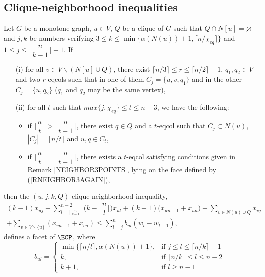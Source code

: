 \subsection{Clique-neighborhood inequalities}

\begin{tthm} \label{TNEIGHBOR3}
Let $G$ be a monotone graph, $u \in V$, $Q$ be a clique of $G$ such that $Q \cap N[u]=\varnothing$ and $j,k$
be numbers verifying $3 \leq k \leq \min \{\alpha(N(u)) + 1, \lceil n/\chi_{eq} \rceil\}$ and
$1 \leq j \leq \biggl\lceil \dfrac{n}{k-1} \biggr\rceil - 1$. If
\begin{enumerate}
\item[(i)] for all $v \in V \backslash (N[u] \cup Q)$, there exist
$\lceil n/3 \rceil \leq r \leq \lceil n/2 \rceil - 1$, $q_1, q_2 \in V$ and two $r$-eqcols such that in one of them
$C_j = \{u, v, q_1\}$ and in the other $C_j = \{u , q_2\}$ ($q_1$ and $q_2$ may be the same vertex),
\item[(ii)] for all $t$ such that $max \{ j, \chi_{eq} \} \leq t \leq n - 3$, we have the following:
\begin{itemize}
\item if $\biggl\lceil \dfrac{n}{t} \biggr\rceil > \biggl\lceil \dfrac{n}{t+1} \biggr\rceil$, there exist $q \in Q$ and
a $t$-eqcol such that $C_j \subset N(u)$, $|C_j| = \lceil n/t \rceil$ and $u, q \in C_t$,
\item if $\biggl\lceil \dfrac{n}{t} \biggr\rceil = \biggl\lceil \dfrac{n}{t+1} \biggr\rceil$, there exists a $t$-eqcol
satisfying conditions given in Remark \ref{NEIGHBOR3POINTS}, \ie lying on the face defined by (\ref{RNEIGHBOR3AGAIN}),
\end{itemize} \end{enumerate}
then the $(u,j,k,Q)$-clique-neighborhood inequality, \ie
\begin{multline} \label{RNEIGHBOR3AGAIN}
(k - 1) x_{uj} +
\sum_{l = \lceil \frac{n}{k-1} \rceil}^{n-2} \biggl(k - \biggl\lceil \dfrac{n}{l} \biggr\rceil \biggr) x_{ul} +
(k - 1) \bigl(x_{u n-1} + x_{un} \bigr) +
\!\!\!\sum_{v \in N(u)\cup Q}\!\!\!x_{vj} \\ + \sum_{v \in V \backslash \{u\}}\!\!\!(x_{v n-1} + x_{vn}) \leq
\sum_{l = j}^n b_{ul} (w_l - w_{l+1}),
\end{multline}
defines a facet of $\ECP$, where
\[ b_{ul} = \begin{cases}
 \min\{\lceil n / l \rceil, \alpha(N(u)) + 1\}, &\textrm{if $j \leq l \leq \lceil n/k \rceil - 1$} \\
 k, &\textrm{if $\lceil n/k \rceil \leq l \leq n - 2$} \\
 k + 1, &\textrm{if $l \geq n - 1$}
\end{cases} \]
\end{tthm}
